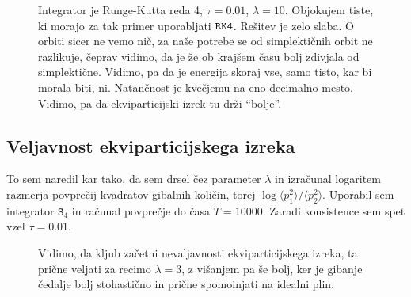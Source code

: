 \documentclass[a4 paper, 12pt]{article}
\begin{document}
\begin{figure}[H]
   \begin{center}
      
   \end{center}
   \vspace{-20pt}
   \caption{Integrator je Runge-Kutta reda 4, $\tau = 0.01$, $\lambda = 10$. Objokujem tiste, ki morajo za tak primer
	uporabljati ${\tt RK4}$. Rešitev je zelo slaba. O orbiti sicer ne vemo nič, za naše potrebe se od simplektičnih
	orbit ne razlikuje, čeprav vidimo, da je že ob krajšem času bolj zdivjala od simplektične. Vidimo, pa da je energija
	skoraj vse, samo tisto, kar bi morala biti, ni. Natančnost je kvečjemu na eno decimalno mesto. Vidimo, pa da
	ekviparticijski izrek tu drži "`bolje"'.}
   \label{fig:pic-L1000}
   \vspace{-10pt}
\end{figure}

\pagebreak

\subsection{Veljavnost ekviparticijskega izreka}

To sem naredil kar tako, da sem drsel čez parameter $\lambda$ in izračunal logaritem razmerja povprečij kvadratov gibalnih
količin, torej $\log\langle p_1^2 \rangle / \langle p_2^2 \rangle$. Uporabil sem integrator ${\mathtt S_4}$ in računal
povprečje do časa $T = 10000$. Zaradi konsistence sem spet vzel $\tau = 0.01$.

\begin{figure}[H]
   \begin{center}
      
   \end{center}
   \vspace{-20pt}
   \caption{Vidimo, da kljub začetni nevaljavnosti
	ekviparticijskega izreka, ta prične veljati za recimo $\lambda = 3$, z višanjem pa še bolj, ker je gibanje čedalje
	bolj stohastično in prične spomoinjati na idealni plin.}
      \label{fig:pic-L}
   \vspace{-10pt}
\end{figure}
\end{document}
